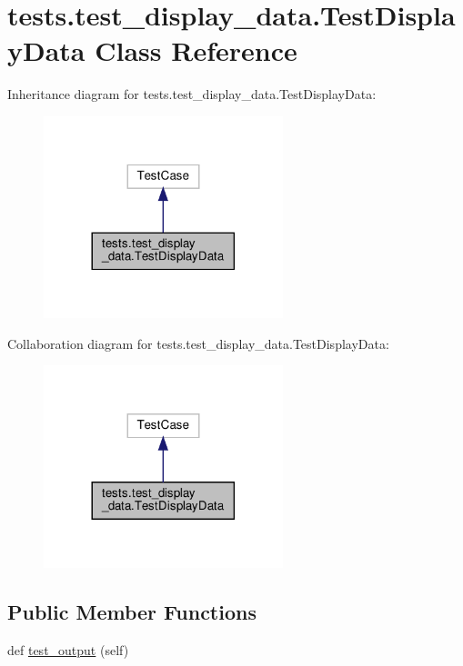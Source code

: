 \hypertarget{classtests_1_1test__display__data_1_1TestDisplayData}{}\section{tests.\+test\+\_\+display\+\_\+data.\+Test\+Display\+Data Class Reference}
\label{classtests_1_1test__display__data_1_1TestDisplayData}


Inheritance diagram for tests.\+test\+\_\+display\+\_\+data.\+Test\+Display\+Data\+:
\nopagebreak
\begin{figure}[H]
\begin{center}
\leavevmode
\includegraphics[width=197pt]{classtests_1_1test__display__data_1_1TestDisplayData__inherit__graph}
\end{center}
\end{figure}


Collaboration diagram for tests.\+test\+\_\+display\+\_\+data.\+Test\+Display\+Data\+:
\nopagebreak
\begin{figure}[H]
\begin{center}
\leavevmode
\includegraphics[width=197pt]{classtests_1_1test__display__data_1_1TestDisplayData__coll__graph}
\end{center}
\end{figure}
\subsection*{Public Member Functions}
\begin{DoxyCompactItemize}
\item 
def \hyperlink{classtests_1_1test__display__data_1_1TestDisplayData_ad9482f68927957ca12e22f14b5b096a0}{test\+\_\+output} (self)
\end{DoxyCompactItemize}


